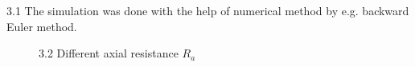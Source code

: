 \documentclass[]{report}
\begin{document}
3.1 The simulation was done with the help of numerical method by e.g. backward Euler method.
\begin{figure}[h!]
	\centering
	\hfill
	\hfill
	\caption*{3.2 Different axial resistance $R_a$}
\end{figure}
\end{document}
